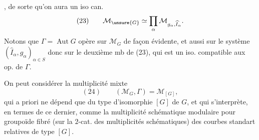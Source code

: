,  de sorte qu'on aura un iso can.
\[
(23)\qquad\mathcal M_{\unsure{G}}\simeq\prod_\alpha\mathcal M_{g_\alpha,\widehat I_\alpha}.
\]
Notons que $\Gamma=\operatorname{Aut}G$ opère sur $\mathcal M_G$ de façon évidente, et aussi sur le système $(\widehat I_\alpha,g_\alpha)_{\alpha\in S}$ donc sur le deuxième mb de (23), qui est un iso. compatible aux op. de $\Gamma$.

On peut considérer la multiplicité mixte
\[
(24)\qquad(\mathcal M_G,\Gamma)=\mathcal M_{[G]},
\]
qui a priori ne dépend que du type d'isomorphie $[G]$ de $G$, et qui s'interprète, en termes de ce dernier, comme la multiplicité schématique modulaire pour  groupoïde fibré (sur la $2$-cat. des multiplicités schématiques) des courbes standart relatives de type $[G]$.
